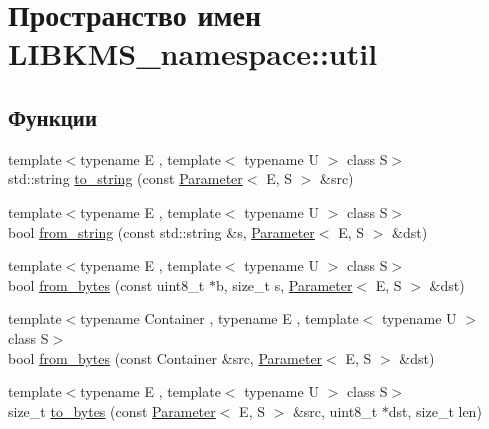 \hypertarget{namespaceLIBKMS__namespace_1_1util}{\section{Пространство имен L\-I\-B\-K\-M\-S\-\_\-namespace\-:\-:util}
\label{namespaceLIBKMS__namespace_1_1util}
}
\subsection*{Функции}
\begin{DoxyCompactItemize}
\item 
{\footnotesize template$<$typename E , template$<$ typename U $>$ class S$>$ }\\std\-::string \hyperlink{namespaceLIBKMS__namespace_1_1util_a6aca094f1844c50997e998a39d99e658}{to\-\_\-string} (const \hyperlink{classLIBKMS__namespace_1_1Parameter}{Parameter}$<$ E, S $>$ \&src)
\item 
{\footnotesize template$<$typename E , template$<$ typename U $>$ class S$>$ }\\bool \hyperlink{namespaceLIBKMS__namespace_1_1util_aa6a46e615d0fb9d64175abbf18f89a13}{from\-\_\-string} (const std\-::string \&s, \hyperlink{classLIBKMS__namespace_1_1Parameter}{Parameter}$<$ E, S $>$ \&dst)
\item 
{\footnotesize template$<$typename E , template$<$ typename U $>$ class S$>$ }\\bool \hyperlink{namespaceLIBKMS__namespace_1_1util_a90d243caef8c555f4c786b3ded8175fe}{from\-\_\-bytes} (const uint8\-\_\-t $\ast$b, size\-\_\-t s, \hyperlink{classLIBKMS__namespace_1_1Parameter}{Parameter}$<$ E, S $>$ \&dst)
\item 
{\footnotesize template$<$typename Container , typename E , template$<$ typename U $>$ class S$>$ }\\bool \hyperlink{namespaceLIBKMS__namespace_1_1util_a81d60ded0db9b86f8c47f2bba7075e84}{from\-\_\-bytes} (const Container \&src, \hyperlink{classLIBKMS__namespace_1_1Parameter}{Parameter}$<$ E, S $>$ \&dst)
\item 
{\footnotesize template$<$typename E , template$<$ typename U $>$ class S$>$ }\\size\-\_\-t \hyperlink{namespaceLIBKMS__namespace_1_1util_a7e4f3e0fd8ee0d9657eae4c1f8d459d2}{to\-\_\-bytes} (const \hyperlink{classLIBKMS__namespace_1_1Parameter}{Parameter}$<$ E, S $>$ \&src, uint8\-\_\-t $\ast$dst, size\-\_\-t len)
\item 

\end{DoxyCompactItemize}
